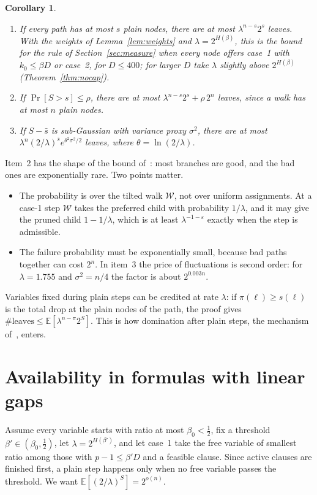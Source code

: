 \documentclass[11pt,a4paper]{article}
\newtheorem{corollary}[theorem]{Corollary}
\theoremstyle{remark}
\newcommand{\E}{\mathbb{E}}
\newcommand{\W}{\mathcal{W}}
\begin{document}
\begin{corollary}\label{cor:avg}
\begin{enumerate}
 \item If every path has at most $s$ plain nodes, there are at most
 $\lambda^{n-s}2^s$ leaves. With the weights of Lemma~\ref{lem:weights} and
 $\lambda=2^{H(\beta)}$, this is the bound for the rule of
 Section~\ref{sec:measure} when every node offers case~1 with $k_0\le\beta D$
 or case~2, for $D\le400$; for larger $D$ take $\lambda$ slightly above
 $2^{H(\beta)}$ (Theorem~\ref{thm:nocap}).
 \item If $\Pr[S>s]\le\rho$, there are at most $\lambda^{n-s}2^s+\rho\,2^n$
 leaves, since a walk has at most $n$ plain nodes.
 \item If $S-\bar s$ is sub-Gaussian with variance proxy $\sigma^2$, there are
 at most $\lambda^n(2/\lambda)^{\bar s}e^{\theta^2\sigma^2/2}$ leaves, where
 $\theta=\ln(2/\lambda)$.
\end{enumerate}
\end{corollary}

Item~2 has the shape of the bound of~\cite{N2}: most branches are good, and the
bad ones are exponentially rare. Two points matter.
\begin{itemize}
 \item The probability is over the tilted walk $\W$, not over uniform
 assignments. At a case-1 step $\W$ takes the preferred child with probability
 $1/\lambda$, and it may give the pruned child $1-1/\lambda$, which is at least
 $\lambda^{-1-\varepsilon}$ exactly when the step is admissible.
 \item The failure probability must be exponentially small, because bad paths
 together can cost $2^n$. In item~3 the price of fluctuations is second order:
 for $\lambda=1.755$ and $\sigma^2=n/4$ the factor is about $2^{0.003n}$.
\end{itemize}
Variables fixed during plain steps can be credited at rate $\lambda$: if
$\pi(\ell)\ge s(\ell)$ is the total drop at the plain nodes of the path, the
proof gives $\#\text{leaves}\le\E[\lambda^{n-\pi}2^S]$. This is how
domination after plain steps, the mechanism of~\cite[Theorem~11]{N3}, enters.

\section{Availability in formulas with linear gaps}\label{sec:availability}

Assume every variable starts with ratio at most $\beta_0<\frac12$, fix a
threshold $\beta'\in(\beta_0,\frac12)$, let $\lambda=2^{H(\beta')}$, and let case~1
take the free variable of smallest ratio among those with $p-1\le\beta'D$ and
a feasible clause. Since active clauses are finished first, a plain step
happens only when no free variable passes the threshold. We want
$\E[(2/\lambda)^S]=2^{o(n)}$.
\end{document}
